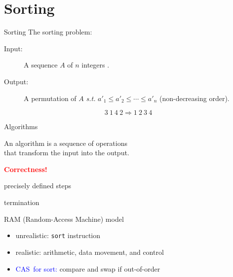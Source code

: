 \section{Sorting}

\begin{frame}{Sorting}
  The sorting problem:
  \begin{description}
	\item[Input:] A sequence $A$ of $n$ integers .
	\item[Output:] A permutation  of $A$ \emph{s.t.} $a'_1 \le a'_2 \le \cdots \le a'_n$ {\small (non-decreasing order)}.
  \end{description}

  \pause

  \[
	3\ 1\ 4\ 2 \Longrightarrow 1\ 2\ 3\ 4
  \]



\end{frame}
\begin{frame}{Algorithms}
  \begin{center}
	An algorithm is a sequence of operations \\
	that transform the input into the output.
  \end{center}

  \pause
  \begin{center}
	\textcolor{red}{\bf Correctness!}
  \end{center}

  \pause

  \begin{description}[<+->][Effectiveness:]
	\item[Definiteness:] precisely defined steps
	\item[Finiteness:] termination
	\item[Effectiveness:] RAM {\scriptsize (Random-Access Machine)} model
	  \begin{itemize}
		\item unrealistic: \texttt{sort} instruction
		\item realistic: arithmetic, data movement, and control
		\item \textcolor{blue}{CAS\footnotemark~for sort:} compare and swap if out-of-order
	  \end{itemize}
  \end{description}
\end{frame}
